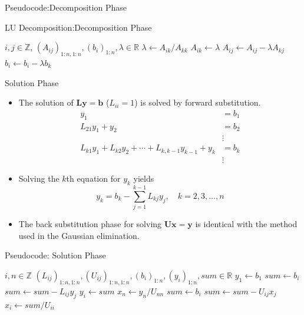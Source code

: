 \documentclass{beamer}
\newcommand{\beforeverb}{\footnotesize}
\newcommand{\afterverb}{\normalsize}
\begin{document}
\begin{frame}{Pseudocode:Decomposition Phase}
\begin{block}{LU Decomposition:Decomposition Phase}
\beforeverb
\begin{algorithmic}[1]
\State  $i, j \in \mathbb{Z}$, $(A_{ij})_{1:n,1:n}, (b_i)_{1:n}, \lambda \in \mathbb{R}$
\State $\lambda \gets A_{ik}/A_{kk}$
\alert{\State $A_{ik}\gets \lambda$}
\State $A_{ij} \gets A_{ij} -\lambda A_{kj} $
\EndFor
\State $b_i \gets b_i-\lambda b_k$
\EndFor
\EndFor
\end{algorithmic}
\afterverb
\end{block}
\end{frame}
\begin{frame}{Solution Phase}
\begin{itemize}
\item The solution of $\mathbf{Ly}=\mathbf{b}$ ($L_{ii}=1$) is solved by \alert{forward substitution}.
\beforeverb
\begin{align*}
y_1&=b_1\\
L_{21}y_1+y_2&=b_2\\
& \vdots\\
L_{k1}y_1+L_{k2}y_2+\cdots+L_{k,k-1}y_{k-1}+y_k &=b_k\\
& \vdots
\end{align*}
\afterverb
\item Solving the $k$th equation for $y_k$ yields
\beforeverb
\[
y_k=b_k-\sum_{j=1}^{k-1}L_{kj}y_j, \quad k=2,3,\ldots,n
\]
\afterverb
\item The back substitution phase for solving $\mathbf{Ux}=\mathbf{y}$ is identical with the method used in the Gaussian elimination.
\end{itemize}
\end{frame}
\begin{frame}{Pseudocode: Solution Phase}

\beforeverb
\begin{algorithmic}[1]
\State  $i,  n \in \mathbb{Z}$
\State $(L_{ij})_{1:n,1:n}, (U_{ij})_{1:n,1:n},(b_i)_{1:n}, (y_i)_{1:n}, sum\in \mathbb{R}$
\State $y_1 \gets b_1$
\State $sum\gets b_i$	
\State $sum\gets sum-L_{ij}y_j$
\EndFor
\State $ y_i \gets sum$
\EndFor
\State $x_n \gets y_n/U_{nn}$
\State $ sum \gets b_i$
\State $sum \gets sum -U_{ij} x_j$
\EndFor
\State $x_i \gets sum/U_{ii}$
\EndFor
\end{algorithmic}
\afterverb

\end{frame}
\end{document}
